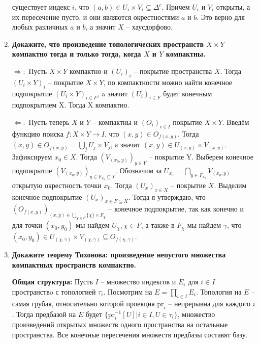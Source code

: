 \documentclass{article}
\begin{document}
\begin{enumerate}
        существует индекс $i$, что $(a,b)\in U_i\times V_i \subseteq\Delta^c$.
        Причем $U_i$ и $V_i$ открыты, а их пересечение пусто, и они являются
        окрестностями $a$ и $b$. Это верно для любых различных $a$ и $b$, а
        значит $X$ – хаусдорфово.
    \item \textbf{Докажите, что произведение топологических пространств 
        $X\times Y$ компактно тогда и только тогда, когда $X$ и $Y$ компактны.}
        \par$\Rightarrow:$ Пусть $X\times Y$ компактно и $(U_i)_i$ – покрытие
        пространства $X$. Тогда $(U_i\times Y)_i$ – покрытие $X\times Y$, по
        компактности можно найти конечное подпокрытие $(U_i\times Y)_{i\in F}$,
        a значит $(U_i)_{i\in F}$ будет конечным подпокрытием X. Тогда X
        компактно.\par
        $\Leftarrow:$ Пусть теперь $X$ и $Y$ – компактны и $(O_i)_{i\in I}$
        покрытие $X\times Y$. Введём функцию поиска $f: X\times Y\longrightarrow
        I$, что $(x,y)\in O_{f(x,y)}$. Тогда $(x,y)\in O_{f(x,y)}=\bigcup_j U_j
        \times V_j$, а значит $(x,y)\in U_{(x,y)}\times V_{(x,y)}$. Зафиксируем
        $x_0\in X$. Тогда $(V_{(x_0,y)})_{y\in Y}$ – покрытие Y. Выберем
        конечное подпокрытие $(V_{(x_0, y)})_{y\in F_{x_0}\subseteq Y}$.
        Обозначим за $U_{x_0}=\bigcap_{y\in F_{x_0}}V_{(x_0,y)}$ открытую
        окрестность точки $x_0$. Тогда $(U_x)_{x\in X}$ – покрытие $X$. Выделим
        конечное подпокрытие $(U_x)_{x\in F\subseteq X}$. Тогда я утверждаю, что
        $(O_{f(x,y)})_{(x,y)\in\bigcup_{\chi\in F}\{\chi\}\times F_\chi}$ – 
        конечное подпокрытие, так как конечно и для точки $(x_0, y_0)$ мы
        найдем $U_{\chi},\chi\in F$, а также в $F_\chi$ мы найдем $\gamma$, что
        $(x_0, y_0)\in U_{(\chi,\gamma)}\times V_{(\chi,\gamma)}\subseteq O_{f(
        \chi,\gamma)}$.
    \item \textbf{Докажите теорему Тихонова: произведение непустого
        множества компактных пространств компактно.}\par\textbf{Общая структура:}
        Пусть $I$ – множество индексов и $E_i$ для $i\in I$ пространствo с
        топологией $\tau_i$. Посмотрим на $E=\prod_{i\in I}E_i$. Топология на
        $E$ – самая грубая, относительно которой проекция $\text{pr}_i$ – 
        непрерывна для каждого $i$. Тогда предбазой на $E$ будет
        $\{\text{pr}_i^{-1}[U]|i\in I,U\in \tau_i\}$, множество
        произведений открытых множеств одного пространства на остальные
        пространства. Все конечные пересечения множеств предбазы составят базу.

\end{enumerate}
\end{document}
